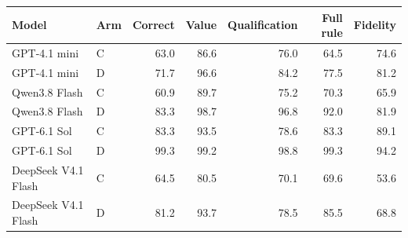 \begin{tabular}{llrrrrr}
\toprule
Model & Arm & Correct & Value & Qualification & Full rule & Fidelity \\
\midrule
GPT-4.1 mini & C & 63.0 & 86.6 & 76.0 & 64.5 & 74.6 \\
GPT-4.1 mini & D & 71.7 & 96.6 & 84.2 & 77.5 & 81.2 \\
Qwen3.8 Flash & C & 60.9 & 89.7 & 75.2 & 70.3 & 65.9 \\
Qwen3.8 Flash & D & 83.3 & 98.7 & 96.8 & 92.0 & 81.9 \\
GPT-6.1 Sol & C & 83.3 & 93.5 & 78.6 & 83.3 & 89.1 \\
GPT-6.1 Sol & D & 99.3 & 99.2 & 98.8 & 99.3 & 94.2 \\
DeepSeek V4.1 Flash & C & 64.5 & 80.5 & 70.1 & 69.6 & 53.6 \\
DeepSeek V4.1 Flash & D & 81.2 & 93.7 & 78.5 & 85.5 & 68.8 \\
\bottomrule
\end{tabular}
